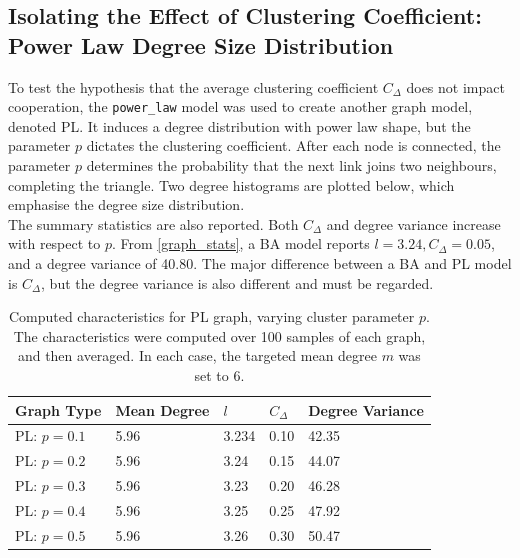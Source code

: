 \subsection{Isolating the Effect of Clustering Coefficient: Power Law Degree Size Distribution}
To test the hypothesis that the average clustering coefficient $C_\Delta$ does not impact cooperation, the \verb+power_law+ model was used to create another graph model, denoted PL. It induces a degree distribution with power law shape, but the parameter $p$ dictates the clustering coefficient. After each node is connected, the parameter $p$ determines the probability that the next link joins two neighbours, completing the triangle. Two degree histograms are plotted below, which emphasise the degree size distribution. \\
\FloatBarrier
{}
\FloatBarrier
{}
\FloatBarrier
The summary statistics are also reported. Both $C_\Delta$ and degree variance increase with respect to $p$. From \ref{graph_stats}, a BA model reports $l=3.24, C_\Delta = 0.05$, and a degree variance of 40.80. The major difference between a BA and PL model is $C_\Delta$, but the degree variance is also different and must be regarded.   \\
\FloatBarrier
\begin{table}[!h]
\begin{center}
\begin{tabular}{|l|l|l|l|l|}
\hline
Graph Type & Mean Degree & $l$ & $C_\Delta$ & Degree Variance \\ \hline
PL: $p=0.1$        & 5.96        & 3.234                         & 0.10                   & 42.35           \\ \hline
PL: $p=0.2$        & 5.96           & 3.24                         & 0.15                   & 44.07               \\ \hline
PL: $p=0.3$       & 5.96        & 3.23                       & 0.20                   & 46.28           \\ \hline
PL: $p=0.4$       & 5.96        & 3.25                         & 0.25                   & 47.92           \\ \hline
PL: $p=0.5$         & 5.96           & 3.26                         & 0.30                   & 50.47            \\ \hline
\end{tabular}
\caption{Computed characteristics for PL graph, varying cluster parameter $p$. The characteristics were computed over 100 samples of each graph, and then averaged. In each case, the targeted mean degree $m$ was set to 6. } \label{graph_stats_PL}
\end{center}
\end{table}
